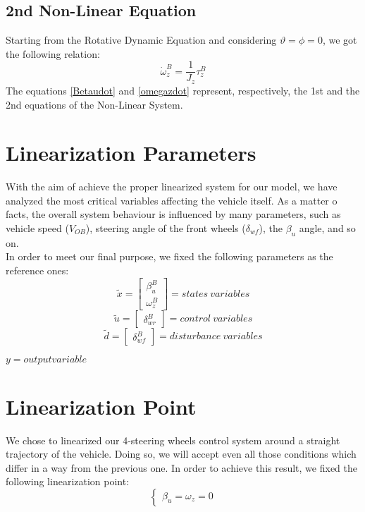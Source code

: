 \documentclass[a4paper,12pt,titlepage]{report}
\begin{document}
	\subsection{2nd Non-Linear Equation}
		Starting from the Rotative Dynamic Equation and considering $\vartheta = \phi = 0$, we got the following relation:
			\begin{equation} \label{omegazdot}
				\dot{\omega}_{z}^{B} = \frac{1}{J_{z}} \tau_{z}^{B}
			\end{equation}
		The equations \ref{Betaudot} and \ref{omegazdot} represent, respectively, the 1st and the 2nd equations of the Non-Linear System.
\section{Linearization Parameters} 
	With the aim of achieve the proper linearized system for our model, we have analyzed the most critical variables affecting the vehicle itself. As a matter o facts, the overall system behaviour is influenced by many parameters, such as vehicle speed ($V_{OB}$), steering angle of the front wheels ($\delta_{wf}$), the $\beta_{u}$ angle, and so on. \\
	In order to meet our final purpose, we fixed the following parameters as the reference ones:\\
		\begin{equation*}
			\tilde{x} =
			\begin{bmatrix}
			\beta_{u}^{B} \\\omega_{z}^{B}
			\end{bmatrix} = states \ variables
		\end{equation*}\quad
		\begin{equation*} 
			\tilde{u} =
			\begin{bmatrix}
			\delta_{wr}^{B} 
			\end{bmatrix} = control \ variables
		\end{equation*}\quad
		\begin{equation*} 
			\tilde{d} =
			\begin{bmatrix}
			\delta_{wf}^{B} 
			\end{bmatrix} = disturbance \ variables
		\end{equation*}
		\begin{center}
			$ y = output variable $	
		\end{center}
\section{Linearization Point} 
	We chose to linearized our 4-steering wheels control system around a straight trajectory of the vehicle. Doing so, we will accept even all those conditions which differ in a way from the previous one. In order to achieve this result, we fixed the following linearization point:
		\begin{equation*}
			\begin{cases}
				\beta_{u} = \omega_{z} = 0
			\end{cases}
		\end{equation*}
\end{document}
